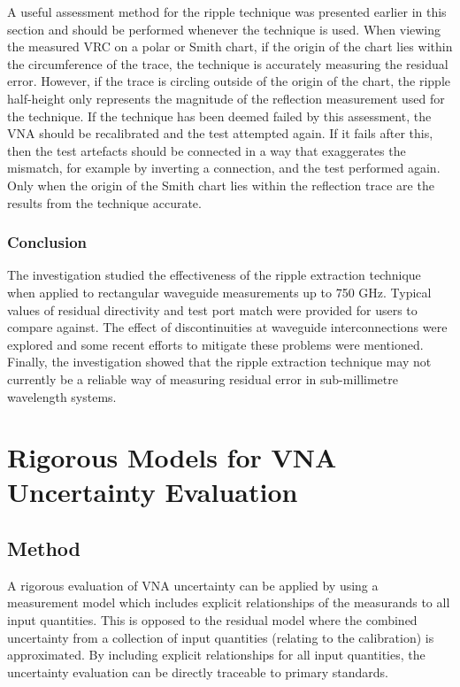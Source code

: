 \documentclass[../thesis/thesis.tex]{subfiles}
\begin{document}
\begin{refsection}
A useful assessment method for the ripple technique was presented earlier in this section and should be performed whenever the technique is used. When viewing the measured VRC on a polar or Smith chart, if the origin of the chart lies within the circumference of the trace, the technique is accurately measuring the residual error. However, if the trace is circling outside of the origin of the chart, the ripple half-height only represents the magnitude of the reflection measurement used for the technique. If the technique has been deemed failed by this assessment, the VNA should be recalibrated and the test attempted again. If it fails after this, then the test artefacts should be connected in a way that exaggerates the mismatch, for example by inverting a connection, and the test performed again. Only when the origin of the Smith chart lies within the reflection trace are the results from the technique accurate.

\subsubsection{Conclusion}

The investigation studied the effectiveness of the ripple extraction technique when applied to rectangular waveguide measurements up to 750 GHz. Typical values of residual directivity and test port match were provided for users to compare against. The effect of discontinuities at waveguide interconnections were explored and some recent efforts to mitigate these problems were mentioned. Finally, the investigation showed that the ripple extraction technique may not currently be a reliable way of measuring residual error in sub-millimetre wavelength systems.

\section{Rigorous Models for VNA Uncertainty Evaluation}
\subsection{Method}

A rigorous evaluation of VNA uncertainty can be applied by using a measurement model which includes explicit relationships of the measurands to all input quantities. This is opposed to the residual model where the combined uncertainty from a collection of input quantities (relating to the calibration) is approximated. By including explicit relationships for all input quantities, the uncertainty evaluation can be directly traceable to primary standards.


\end{refsection}
\end{document}
